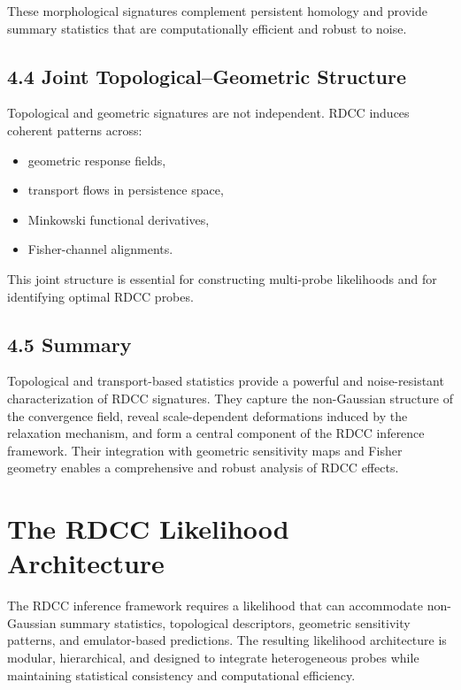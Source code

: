 \documentclass[11pt,a4paper]{article}
\begin{document}
These morphological signatures complement persistent homology and provide 
summary statistics that are computationally efficient and robust to noise.

\subsection*{4.4 Joint Topological–Geometric Structure}

Topological and geometric signatures are not independent. RDCC induces coherent 
patterns across:

\begin{itemize}
    \item geometric response fields,
    \item transport flows in persistence space,
    \item Minkowski functional derivatives,
    \item Fisher-channel alignments.
\end{itemize}

This joint structure is essential for constructing multi-probe likelihoods and 
for identifying optimal RDCC probes.

\subsection*{4.5 Summary}

Topological and transport-based statistics provide a powerful and 
noise-resistant characterization of RDCC signatures. They capture the 
non-Gaussian structure of the convergence field, reveal scale-dependent 
deformations induced by the relaxation mechanism, and form a central component 
of the RDCC inference framework. Their integration with geometric sensitivity 
maps and Fisher geometry enables a comprehensive and robust analysis of RDCC 
effects.
\section{The RDCC Likelihood Architecture}

The RDCC inference framework requires a likelihood that can accommodate 
non-Gaussian summary statistics, topological descriptors, geometric sensitivity 
patterns, and emulator-based predictions. The resulting likelihood architecture 
is modular, hierarchical, and designed to integrate heterogeneous probes while 
maintaining statistical consistency and computational efficiency.
\end{document}
